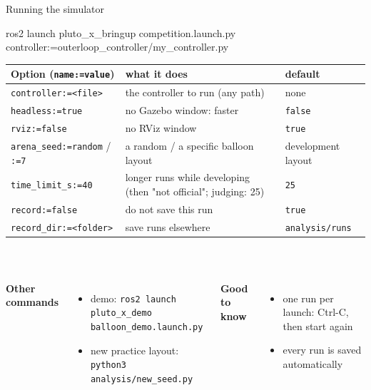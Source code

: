 \documentclass[aspectratio=169,11pt]{beamer}
\newcommand{\code}[1]{\texttt{\small #1}}
\begin{document}
\begin{frame}[fragile]{Running the simulator}
\begin{semiverbatim}\scriptsize
ros2 launch pluto_x_bringup competition.launch.py controller:=outerloop_controller/my_controller.py
\end{semiverbatim}
  \vspace{-1mm}
  \scriptsize
  \renewcommand{\arraystretch}{1.1}
  \begin{tabularx}{\linewidth}{@{}l X l@{}}
    \toprule
    \textbf{Option} (\code{name:=value}) & \textbf{what it does} & \textbf{default} \\
    \midrule
    \code{controller:=<file>} & the controller to run (any path) & none \\
    \code{headless:=true} & no Gazebo window: faster & \code{false} \\
    \code{rviz:=false} & no RViz window & \code{true} \\
    \code{arena\_seed:=random} / \code{:=7} & a random / a specific balloon layout & development layout \\
    \code{time\_limit\_s:=40} & longer runs while developing (then "not official"; judging: 25) & \code{25} \\
    \code{record:=false} & do not save this run & \code{true} \\
    \code{record\_dir:=<folder>} & save runs elsewhere & \code{analysis/runs} \\
    \bottomrule
  \end{tabularx}\\[2mm]
  \normalsize
  \begin{columns}[T]
    \small\textbf{Other commands}
    \begin{itemize}\scriptsize
      \item demo: \code{ros2 launch pluto\_x\_demo balloon\_demo.launch.py}
      \item new practice layout: \code{python3 analysis/new\_seed.py}
    \end{itemize}
    \small\textbf{Good to know}
    \begin{itemize}\scriptsize
      \item one run per launch: Ctrl-C, then start again
      \item every run is saved automatically
    \end{itemize}
  \end{columns}
\end{frame}
\end{document}
